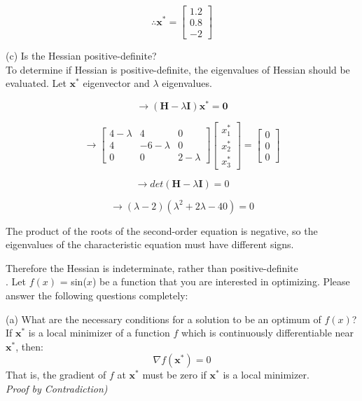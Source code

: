 \documentclass{article} %
\begin{document}
{    \[ \therefore \mathbf{x^*} = \begin{bmatrix}
        1.2 \\ 0.8 \\ -2
    \end{bmatrix} \]

    \noindent (c) Is the Hessian positive-definite? \\

    To determine if Hessian is positive-definite, the eigenvalues of Hessian should be evaluated.
    Let $\mathbf{x^*}$ eigenvector and $\lambda$ eigenvalues.

    \[ \rightarrow (\mathbf{H} - \lambda \mathbf{I}) \mathbf{x^*} = \mathbf{0} \]

    \[ \rightarrow \begin{bmatrix}
        4 - \lambda & 4 & 0 \\
        4 & -6 - \lambda & 0 \\
        0 & 0 & 2 - \lambda
    \end{bmatrix} \begin{bmatrix}
        x^*_1 \\ x^*_2 \\ x^*_3
    \end{bmatrix} = \begin{bmatrix}
        0 \\ 0 \\ 0
    \end{bmatrix} \]

    \[ \rightarrow det(\mathbf{H} - \lambda \mathbf{I}) = 0 \]

    \[ \rightarrow (\lambda - 2)(\lambda^2 + 2\lambda -40) = 0 \]

    The product of the roots of the second-order equation is negative,
    so the eigenvalues of the characteristic equation must have different signs.
    
    Therefore the Hessian is indeterminate, rather than positive-definite \\

    . Let $f(x)$ = sin($x$) be a function that you are interested in optimizing. Please answer the following
    questions completely:

    \noindent (a) What are the necessary conditions for a solution to be an optimum of $ f(x) $? \\

    If \( \mathbf{x}^* \) is a local minimizer of a function \( f \) which is continuously differentiable near \( \mathbf{x}^* \), then:
    \[
    \nabla f(\mathbf{x}^*) = 0
    \]
    \noindent That is, the gradient of \( f \) at \( \mathbf{x}^* \) must be zero if \( \mathbf{x}^* \) is a local minimizer. \\
    \textit{Proof by Contradiction)}

}
\end{document}
